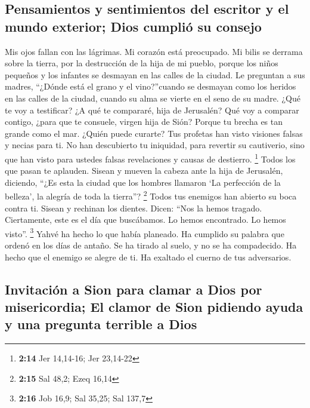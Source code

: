 \begin{paracol}{2}
{\subsection{Pensamientos y sentimientos del escritor y el mundo
exterior; Dios cumplió su
consejo}\label{pensamientos-y-sentimientos-del-escritor-y-el-mundo-exterior-dios-cumpliuxf3-su-consejo}}

 Mis ojos fallan con las lágrimas. Mi corazón está
preocupado. Mi bilis se derrama sobre la tierra, por la destrucción de
la hija de mi pueblo, porque los niños pequeños y los infantes se
desmayan en las calles de la ciudad.  Le preguntan a sus
madres, ``¿Dónde está el grano y el vino?''cuando se desmayan como los
heridos en las calles de la ciudad, cuando su alma se vierte en el seno
de su madre.  ¿Qué te voy a testificar? ¿A qué te
compararé, hija de Jerusalén? Qué voy a comparar contigo, ¿para que te
consuele, virgen hija de Sión? Porque tu brecha es tan grande como el
mar. ¿Quién puede curarte?  Tus profetas han visto
visiones falsas y necias para ti. No han descubierto tu iniquidad, para
revertir su cautiverio, sino que han visto para ustedes falsas
revelaciones y causas de destierro. \footnote{\textbf{2:14} Jer
  14,14-16; Jer 23,14-22}  Todos los que pasan te
aplauden. Sisean y mueven la cabeza ante la hija de Jerusalén, diciendo,
``¿Es esta la ciudad que los hombres llamaron `La perfección de la
belleza', la alegría de toda la tierra''? \footnote{\textbf{2:15} Sal
  48,2; Ezeq 16,14}  Todos tus enemigos han abierto su
boca contra ti. Sisean y rechinan los dientes. Dicen: ``Nos la hemos
tragado. Ciertamente, este es el día que buscábamos. Lo hemos
encontrado. Lo hemos visto''. \footnote{\textbf{2:16} Job 16,9; Sal
  35,25; Sal 137,7}  Yahvé ha hecho lo que había
planeado. Ha cumplido su palabra que ordenó en los días de antaño. Se ha
tirado al suelo, y no se ha compadecido. Ha hecho que el enemigo se
alegre de ti. Ha exaltado el cuerno de tus adversarios.

\hypertarget{invitaciuxf3n-a-sion-para-clamar-a-dios-por-misericordia-el-clamor-de-sion-pidiendo-ayuda-y-una-pregunta-terrible-a-dios}{%
\subsection{Invitación a Sion para clamar a Dios por misericordia; El
clamor de Sion pidiendo ayuda y una pregunta terrible a
Dios}\label{invitaciuxf3n-a-sion-para-clamar-a-dios-por-misericordia-el-clamor-de-sion-pidiendo-ayuda-y-una-pregunta-terrible-a-dios}}


\end{paracol}
